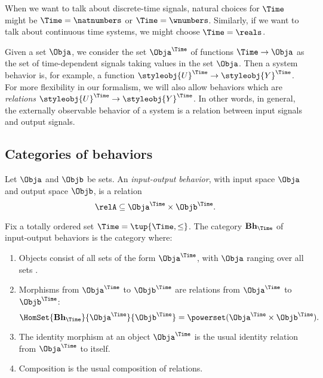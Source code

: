 When we want to talk about discrete-time signals, natural choices for $\Time$ might be $\Time = \natnumbers$ or $\Time = \wnumbers$.
Similarly, if we want to talk about continuous time systems, we might choose $\Time = \reals$.

Given a set $\Obja$, we consider the set $\Obja^\Time$ of functions $\Time \to \Obja$ as the set of time-dependent signals taking values in the set $\Obja$.
Then a system behavior is, for example, a function $\styleobj{U}^\Time \to \styleobj{Y}^\Time$.
For more flexibility in our formalism, we will also allow behaviors which are \emph{relations} $\styleobj{U}^\Time \to \styleobj{Y}^\Time$.
In other words, in general, the externally observable behavior of a system is a relation between input signals and output signals.

\subsection{Categories of behaviors}

\begin{definition}
    Let $\Obja$ and $\Objb$ be sets.
    An \emph{input-output behavior}, with input space $\Obja$ and output space $\Objb$, is a relation
    \begin{equation}
        \relA \subseteq \Obja^\Time \times \Objb^\Time.
    \end{equation}
\end{definition}

\begin{definition}
    Fix a totally ordered set $\Time = \tup{\Time, \leq}$.
    The category $\textbf{Bh}_\Time$ of input-output behaviors is the category where:
    \begin{enumerate}
        \item Objects consist of all sets of the form $\Obja^\Time$, with $\Obja$ ranging over all sets .
        \item Morphisms from $\Obja^\Time$ to $\Objb^\Time$ are relations from $\Obja^\Time$ to $\Objb^\Time$:
              \begin{equation}
                  \HomSet{\textbf{Bh}_\Time}{\Obja^\Time}{\Objb^\Time} = \powerset (\Obja^\Time \times \Objb^\Time).
              \end{equation}
        \item The identity morphism at an object $\Obja^\Time$ is the usual identity relation from $\Obja^\Time$ to itself.
        \item Composition is the usual composition of relations.
    \end{enumerate}
\end{definition}

